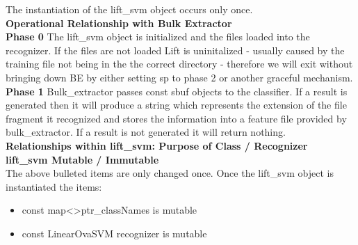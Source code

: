 \documentclass{report}
\begin{document}
The instantiation of the lift\_svm object occurs only once.
\\
\textbf{Operational Relationship with Bulk Extractor}\\
\textbf{Phase 0}
The lift\_svm object is initialized and the files loaded into the recognizer.  If the files are not loaded Lift is uninitalized - usually caused by the training file not being in the 
the correct directory - therefore we will exit without bringing down BE by either setting sp to phase 2 or another graceful mechanism.
\\
\textbf{Phase 1}
Bulk\_extractor passes const sbuf objects to the classifier.  If a result is generated then it will produce a string which represents the extension of the file fragment it recognized and stores the information into a feature file provided by bulk\_extractor.  If a result is not generated it will return nothing.
\\
\textbf{Relationships within lift\_svm: Purpose of Class / Recognizer}
\\
\textbf{lift\_svm Mutable / Immutable}
\\
The above bulleted items are only changed once.  Once the lift\_svm object is instantiated the items:

\begin{itemize}
\renewcommand{\labelitemi}{$\bullet$}
\item const map\textless \textgreater ptr\_classNames is mutable
\item const LinearOvaSVM recognizer is mutable
\end{itemize}
\end{document}
